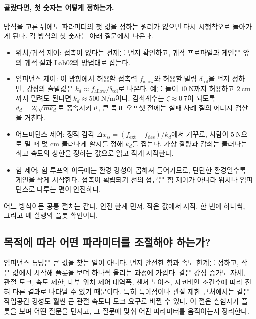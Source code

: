 \paragraph{골랐다면, 첫 숫자는 어떻게 정하는가.}
방식을 고른 뒤에도 파라미터의 첫 값을 정하는 원리가 없으면 다시 시행착오로 돌아가게 된다.
각 방식의 첫 숫자는 아래 질문에서 나온다.
%
\begin{itemize}
  \item 위치/궤적 제어: 접촉이 없다는 전제를 먼저 확인하고, 궤적 프로파일과 게인은 앞의 궤적 절과 Lab02의 방법대로 잡는다.
  \item 임피던스 제어: 이 방향에서 허용할 접촉력 \(f_{\mathrm{allow}}\)와 허용할 밀림 \(\delta_{\mathrm{tol}}\)을 먼저 정하면, 강성의 출발값은 \(k_d\approx f_{\mathrm{allow}}/\delta_{\mathrm{tol}}\)로 나온다. 예를 들어 \(10~\mathrm{N}\)까지 허용하고 \(2~\mathrm{cm}\)까지 밀려도 된다면 \(k_d\approx500~\mathrm{N/m}\)이다. 감쇠계수는 \(\zeta\approx0.7\)이 되도록 \(d_d=2\zeta\sqrt{m k_d}\)로 종속시키고, 큰 목표 오프셋 전에는 실패 사례 절의 에너지 검산을 거친다.
  \item 어드미턴스 제어: 정적 감각 \(\Delta x_{\mathrm{ss}}=(f_{\mathrm{ext}}-f_{\mathrm{des}})/k_d\)에서 거꾸로, 사람이 \(5~\mathrm{N}\)으로 밀 때 몇 cm 물러나게 할지를 정해 \(k_d\)를 잡는다. 가상 질량과 감쇠는 물러나는 최고 속도의 상한을 정하는 값으로 읽고 작게 시작한다.
  \item 힘 제어: 힘 루프의 이득에는 환경 강성이 곱해져 들어가므로, 단단한 환경일수록 게인을 작게 시작한다. 접촉이 확립되기 전의 접근은 힘 제어가 아니라 위치나 임피던스로 다루는 편이 안전하다.
\end{itemize}
어느 방식이든 공통 절차는 같다.
안전 한계 먼저, 작은 값에서 시작, 한 번에 하나씩, 그리고 매 실행의 플롯 확인이다.

\subsection{목적에 따라 어떤 파라미터를 조절해야 하는가?}

임피던스 튜닝은 큰 값을 찾는 일이 아니다.
먼저 안전한 힘과 속도 한계를 정하고, 작은 값에서 시작해 플롯을 보며 하나씩 올리는 과정에 가깝다.
같은 강성 증가도 자세, 관절 토크, 속도 제한, 내부 위치 제어 대역폭, 센서 노이즈, 자코비안 조건수에 따라 전혀 다른 결과로 나타날 수 있기 때문이다.
특히 특이점이나 관절 제한 근처에서는 같은 작업공간 강성도 훨씬 큰 관절 속도나 토크 요구로 바뀔 수 있다.
이 절은 실험자가 플롯을 보며 어떤 질문을 던지고, 그 질문에 맞춰 어떤 파라미터를 움직이는지 정리한다.

